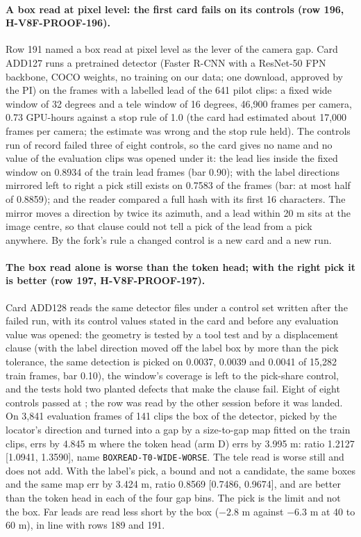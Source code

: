 \paragraph{A box read at pixel level: the first card fails on its controls (row 196, H-V8F-PROOF-196).} Row 191 named a box read at pixel level as the lever of the camera gap. Card ADD127 runs a pretrained detector (Faster R-CNN with a ResNet-50 FPN backbone, COCO weights, no training on our data; one download, approved by the PI) on the frames with a labelled lead of the 641 pilot clips: a fixed wide window of 32 degrees and a tele window of 16 degrees, 46,900 frames per camera, 0.73 GPU-hours against a stop rule of 1.0 (the card had estimated about 17,000 frames per camera; the estimate was wrong and the stop rule held). The controls run of record failed three of eight controls, so the card gives no name and no value of the evaluation clips was opened under it: the lead lies inside the fixed window on 0.8934 of the train lead frames (bar 0.90); with the label directions mirrored left to right a pick still exists on 0.7583 of the frames (bar: at most half of 0.8859); and the reader compared a full hash with its first 16 characters. The mirror moves a direction by twice its azimuth, and a lead within 20 m sits at the image centre, so that clause could not tell a pick of the lead from a pick anywhere. By the fork's rule a changed control is a new card and a new run.

\paragraph{The box read alone is worse than the token head; with the right pick it is better (row 197, H-V8F-PROOF-197).} Card ADD128 reads the same detector files under a control set written after the failed run, with its control values stated in the card and before any evaluation value was opened: the geometry is tested by a tool test and by a displacement clause (with the label direction moved off the label box by more than the pick tolerance, the same detection is picked on 0.0037, 0.0039 and 0.0041 of 15,282 train frames, bar 0.10), the window's coverage is left to the pick-share control, and the tests hold two planted defects that make the clause fail. Eight of eight controls passed at ; the row was read by the other session before it was landed. On 3,841 evaluation frames of 141 clips the box of the detector, picked by the locator's direction and turned into a gap by a size-to-gap map fitted on the train clips, errs by 4.845 m where the token head (arm D) errs by 3.995 m: ratio 1.2127 [1.0941, 1.3590], name \texttt{BOXREAD-T0-WIDE-WORSE}. The tele read is worse still and does not add. With the label's pick, a bound and not a candidate, the same boxes and the same map err by 3.424 m, ratio 0.8569 [0.7486, 0.9674], and are better than the token head in each of the four gap bins. The pick is the limit and not the box. Far leads are read less short by the box ($-2.8$ m against $-6.3$ m at 40 to 60 m), in line with rows 189 and 191.

